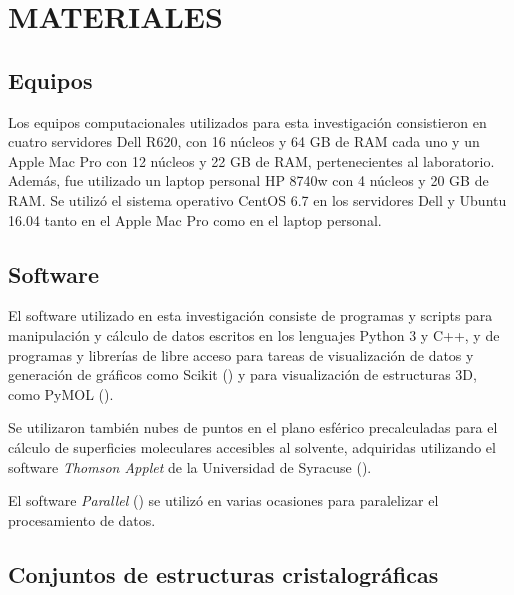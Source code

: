 \newpage
\section*{MATERIALES}
\par{}
\subsection{Equipos}
\par
Los equipos computacionales utilizados para esta investigación consistieron en cuatro servidores Dell R620, con 16 núcleos y 64 GB de RAM cada uno y un Apple Mac Pro con 12 núcleos y 22 GB de RAM, pertenecientes al laboratorio. 
Además, fue utilizado un laptop personal HP 8740w con 4 núcleos y 20 GB de RAM. 
Se utilizó el sistema operativo CentOS 6.7 en los servidores Dell y Ubuntu 16.04 tanto en el Apple Mac Pro como en el laptop personal.
\subsection{Software}
\par
El software utilizado en esta investigación consiste de programas y scripts para manipulación y cálculo de datos escritos en los lenguajes Python 3 y C++, y de programas y librerías de libre acceso para tareas de visualización de datos y generación de gráficos como Scikit (\cite{Pedregosa2012}) y para visualización de estructuras 3D, como PyMOL (\cite{PyMOL}).
\par
Se utilizaron también nubes de puntos en el plano esférico precalculadas para el cálculo de superficies moleculares accesibles al solvente, adquiridas utilizando el software \textit{Thomson Applet} de la Universidad de Syracuse (\cite{Saff1997,thomson}).
\par
El software \textit{Parallel} (\cite{Tange2011a}) se utilizó en varias ocasiones para paralelizar el procesamiento de datos.

\subsection{Conjuntos de estructuras cristalográficas}

